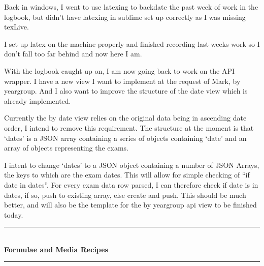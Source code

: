 \documentclass[idxtotoc,hyperref,openany]{labbook} %
\newcommand{\HRule}{\rule{\linewidth}{0.5mm}} %
\begin{document}
Back in windows, I went to use latexing to backdate the past week of work in the logbook, but didn't have latexing in sublime set up correctly as I was missing texLive.

I set up latex on the machine properly and finished recording last weeks work so I don't fall too far behind and now here I am.


With the logbook caught up on, I am now going back to work on the API wrapper.  I have a new view I want to implement at the request of Mark, by yeargroup.  And I also want to improve the structure of the date view which is already implemented.

Currently the by date view relies on the original data being in ascending date order, I intend to remove this requirement.  The structure at the moment is that `dates' is a JSON array containing a series of objects containing `date' and an array of objects representing the exams.

I intent to change `dates' to a JSON object containing a number of JSON Arrays, the keys to which are the exam dates.  This will allow for simple checking of ``if date in dates''.  For every exam data row parsed, I can therefore check if date is in dates, if so, push to existing array, else create and push.  This should be much better, and will also be the template for the by yeargroup api view to be finished today.


\labday{} %

\begin{center}
\HRule \\[0.4cm]
{\huge \textbf{Formulae and Media Recipes}}\\[0.4cm] %
\HRule \\[1.5cm]
\end{center}


\newpage

\end{document}
